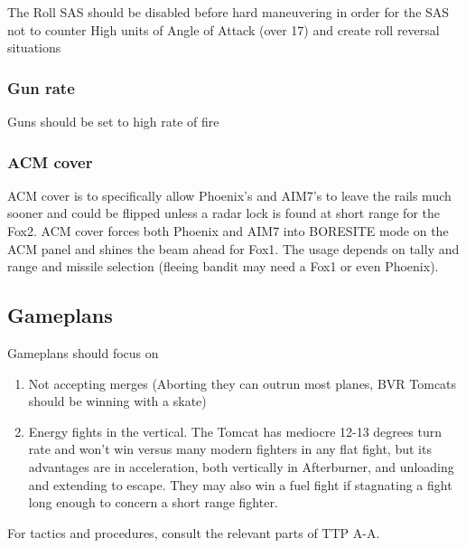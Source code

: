 The Roll SAS should be disabled before hard maneuvering in order for the SAS
not to counter High units of Angle of Attack (over 17) and create roll reversal
situations

\subsubsection*{Gun rate}

Guns should be set to high rate of fire

\subsubsection*{ACM cover}

ACM cover is to specifically allow Phoenix's and AIM7's to leave the rails much
sooner and could be flipped unless a radar lock is found at short range for the
Fox2. ACM cover forces both Phoenix and AIM7 into BORESITE mode on the ACM
panel and shines the beam ahead for Fox1. The usage depends on tally and range
and missile selection (fleeing bandit may need a Fox1 or even Phoenix).

\subsection{Gameplans}

Gameplans should focus on
{
 \setlength\parskip{0em}
 \begin{enumerate}[label=\alph*)]

   \item Not accepting merges (Aborting they can outrun most planes, BVR
     Tomcats should be winning with a skate)

   \item Energy fights in the vertical. The Tomcat has mediocre 12-13 degrees
     turn rate and won't win versus many modern fighters in any flat fight, but
     its advantages are in acceleration, both vertically in Afterburner, and
     unloading and extending to escape. They may also win a fuel fight if
     stagnating a fight long enough to concern a short range fighter.

 \end{enumerate}
}

For tactics and procedures, consult the relevant parts of TTP A-A.
